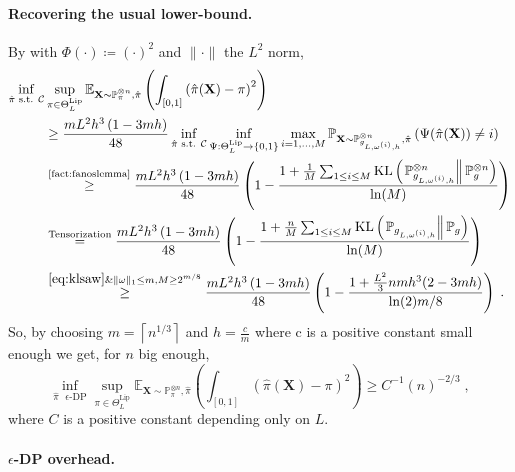 \documentclass[10pt]{article} %
\newcommand{\Prob}[0]{\mathbb{P}}
\newcommand{\E}[0]{\mathbb{E}}
\newcommand\vect[1]{\mathbf{#1}}
\newcommand\kl[2]{\mathrm{KL}\left( \left. {#1}\right\Vert {#2} \right)}
\newcommand\p[1]{\left( {#1}\right)}
\newcommand\ceil[1]{\left\lceil {#1}\right\rceil}
\begin{document}
\paragraph{Recovering the usual lower-bound.}

By  with $\Phi(\cdot) \coloneqq (\cdot)^2$ and $\|\cdot\|$ the $L^2$ norm,
\begin{equation}
\label{eq:dqslijuhfvsjkdcv}
    \begin{aligned}
    \inf_{\hat{\pi}  \text{ s.t. } \mathcal{C}} &\sup_{\pi \in \Theta^{\text{Lip}}_L}
    \E_{\vect{X} \sim \Prob_{\pi}^{\otimes n}, \hat{\pi}}\p{ \int_{[0, 1]}\p{\hat{\pi}(\vect{X})- \pi}^2} \\
    &\geq 
    \frac{mL^2 h^3\p{1 - 3 mh}}{48}
    \inf_{\hat{\pi}  \text{ s.t. } \mathcal{C}} \inf_{\Psi : \Theta^{\text{Lip}}_L \rightarrow \{0, 1\}}
    \max_{i = 1, \dots, M}  \Prob_{\vect{X} \sim \Prob_{g_{L, \omega^{(i)}, h}}^{\otimes n}, \hat{\pi}}                \p{\Psi(\hat{\pi}(\vect{X})) \neq i}  \\
    &\stackrel{\text{\Cref{fact:fanoslemma}}}{\geq}
    \frac{mL^2h^3\p{1 - 3 mh}}{48}
    \p{1 - \frac{1 + \frac{1}{M} \sum_{1\leq i\leq M} \kl{\Prob_{g_{L, \omega^{(i)}, h}}^{\otimes n}}{\Prob_{g}^{\otimes n}}}{\ln (M)}} \\
    &\stackrel{\text{Tensorization}}{=}
    \frac{mL^2 h^3\p{1 - 3 mh}}{48}
    \p{1 - \frac{1 + \frac{n}{M} \sum_{1\leq i\leq M} \kl{\Prob_{g_{L, \omega^{(i)}, h}}}{\Prob_{g}}}{\ln (M)}} \\
    &\stackrel{\eqref{eq:klsaw} \& \|\omega\|_1\leq m, M \geq 2^{m/8}}{\geq}
    \frac{mL^2 h^3\p{1 - 3 mh}}{48}
    \p{1 - \frac{1 +  \frac{L^2}{3}n m h^3 (2 - 3m h)}{\ln(2) m/8}} \;.
    \end{aligned}
\end{equation}
So, by choosing $m = \ceil{n^{
1/3}}$ and $h = \frac{c}{m}$ where c is a positive constant small enough we get, for $n$ big enough, 
\begin{equation*}
    \inf_{\hat{\pi} \text{ $\epsilon$-DP}} \sup_{\pi \in \Theta^{\text{Lip}}_L}
    \E_{\vect{X} \sim \Prob_{\pi}^{\otimes n}, \hat{\pi}}\p{ \int_{[0, 1]}\p{\hat{\pi}(\vect{X})- \pi}^2} \geq C^{-1} (n)^{-2/3} \;,
\end{equation*}
where $C$ is a positive constant depending only on $L$.

\paragraph{$\epsilon$-DP overhead.}
\end{document}
